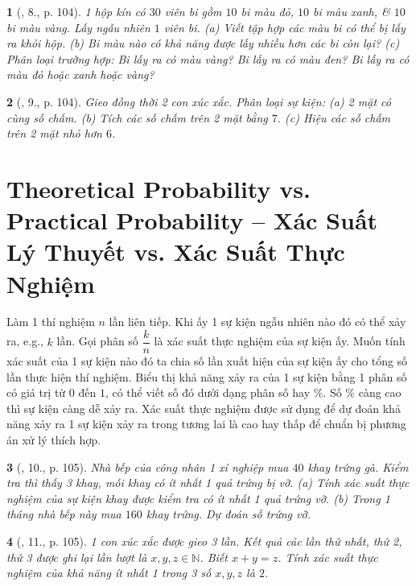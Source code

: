 \documentclass{article}
\newtheorem{baitoan}{}
\begin{document}
\begin{baitoan}[\cite{Tuyen_Toan_6}, 8., p. 104]
	1 hộp kín có $30$ viên bi gồm $10$ bi màu đỏ, $10$ bi màu xanh, \& $10$ bi màu vàng. Lấy ngẫu nhiên $1$ viên bi. (a) Viết tập hợp các màu bi có thể bị lấy ra khỏi hộp. (b) Bi màu nào có khả năng được lấy nhiều hơn các bi còn lại? (c) Phân loại trường hợp: Bi lấy ra có màu vàng? Bi lấy ra có màu đen? Bi lấy ra có màu đỏ hoặc xanh hoặc vàng?
\end{baitoan}

\begin{baitoan}[\cite{Tuyen_Toan_6}, 9., p. 104]
	Gieo đồng thời 2 con xúc xắc. Phân loại sự kiện: (a) 2 mặt có cùng số chấm. (b) Tích các số chấm trên 2 mặt bằng $7$. (c) Hiệu các số chấm trên 2 mặt nhỏ hơn $6$.
\end{baitoan}


\section{Theoretical Probability vs. Practical Probability -- Xác Suất Lý Thuyết vs. Xác Suất Thực Nghiệm}
 Làm 1 thí nghiệm $n$ lần liên tiếp. Khi ấy 1 sự kiện ngẫu nhiên nào đó có thể xảy ra, e.g., $k$ lần. Gọi phân số $\dfrac{k}{n}$ là xác suất thực nghiệm của sự kiện ấy. Muốn tính xác suất của 1 sự kiện nào đó ta chia số lần xuất hiện của sự kiện ấy cho tổng số lần thực hiện thí nghiệm.  Biểu thị khả năng xảy ra của 1 sự kiện bằng 1 phân số có giá trị từ $0$ đến $1$, có thể viết số đó dưới dạng phân số hay $\%$. Số $\%$ càng cao thì sự kiện càng dễ xảy ra.  Xác suất thực nghiệm được sử dụng để dự đoán khả năng xảy ra 1 sự kiện xảy ra trong tương lai là cao hay thấp để chuẩn bị phương án xử lý thích hợp.

\begin{baitoan}[\cite{Tuyen_Toan_6}, 10., p. 105]
	Nhà bếp của công nhân 1 xí nghiệp mua $40$ khay trứng gà. Kiểm tra thì thấy 3 khay, mỗi khay có ít nhất 1 quả trứng bị vỡ. (a) Tính xác suất thực nghiệm của sự kiện khay được kiểm tra có ít nhất 1 quả trứng vỡ. (b) Trong 1 tháng nhà bếp này mua $160$ khay trứng. Dự đoán số trứng vỡ.
\end{baitoan}

\begin{baitoan}[\cite{Tuyen_Toan_6}, 11., p. 105]
	1 con xúc xắc được gieo 3 lần. Kết quả các lần thứ nhất, thứ 2, thứ 3 được ghi lại lần lượt là $x,y,z\in\mathbb{N}$. Biết $x + y = z$. Tính xác suất thực nghiệm của khả năng ít nhất 1 trong 3 số $x,y,z$ là $2$.
\end{baitoan}
\end{document}
